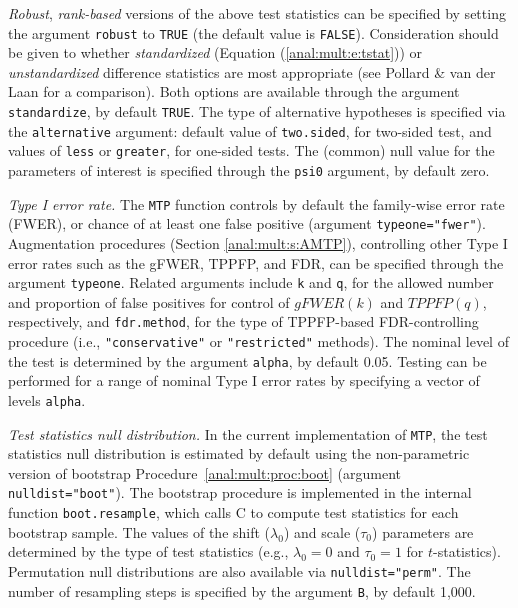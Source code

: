 \documentclass[11pt]{article}
\newcommand{\Robject}[1]{\texttt{#1}}
\begin{document}
\begin{description}
{\em Robust}, {\em rank-based} versions of the above test statistics can be specified by setting the argument \Robject{robust} to \Robject{TRUE} (the default value is \Robject{FALSE}). 
Consideration should be given to whether {\em standardized} (Equation (\ref{anal:mult:e:tstat})) or {\em unstandardized} difference statistics are most appropriate (see Pollard \& van der Laan \cite{Pollard&vdLaanJSPI04} for a comparison). Both options are available through the argument \Robject{standardize}, by default \Robject{TRUE}. 
The type of alternative hypotheses is specified via the \Robject{alternative} argument: default value of \Robject{two.sided}, for two-sided test, and values of \Robject{less} or \Robject{greater}, for one-sided tests. 
The (common) null value for the parameters of interest is specified through the \Robject{psi0} argument, by default zero.  


\item{\em Type I error rate.} 
The \Robject{MTP} function controls by default the family-wise error rate (FWER), or chance of at least one false positive (argument \Robject{typeone="fwer"}). 
Augmentation procedures (Section \ref{anal:mult:s:AMTP}), controlling other Type I error rates such as the gFWER, TPPFP, and FDR, can be specified through the argument \Robject{typeone}.
Related arguments include \Robject{k} and \Robject{q}, for the allowed number and proportion of false positives for control of $gFWER(k)$ and $TPPFP(q)$, respectively, and \Robject{fdr.method}, for the type of TPPFP-based FDR-controlling procedure (i.e., \Robject{"conservative"} or \Robject{"restricted"} methods).
The nominal level of the test is determined by the argument \Robject{alpha}, by default 0.05. 
Testing can be performed for a range of nominal Type I error rates by specifying a vector of levels \Robject{alpha}. 


\item{\em Test statistics null distribution.} 
In the current implementation of \Robject{MTP}, the test statistics null distribution is estimated by default using the non-parametric version of bootstrap Procedure~\ref{anal:mult:proc:boot} (argument \Robject{nulldist="boot"}). 
The bootstrap procedure is implemented in the internal function \Robject{boot.resample}, which calls C to compute test statistics for each bootstrap sample.
The values of the shift ($\lambda_0$) and scale ($\tau_0$) parameters are determined by the type of test statistics (e.g., $\lambda_0=0$ and $\tau_0=1$ for $t$-statistics). 
Permutation null distributions are also available via \Robject{nulldist="perm"}.
The number of resampling steps is specified by the argument \Robject{B}, by default 1,000. 


\end{description}
\end{document}
